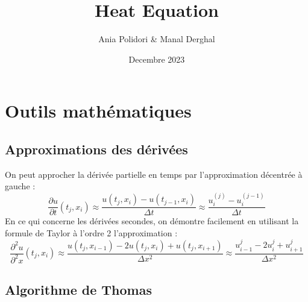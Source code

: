 \documentclass{article}
\title{Heat Equation}
\author{Ania Polidori \& Manal Derghal}
\date{Decembre 2023}
\begin{document}
\maketitle

\tableofcontents

\newpage

\section{Outils mathématiques}

\subsection{Approximations des dérivées}

On peut approcher la dérivée partielle en temps par l'approximation décentrée à gauche :\\
\begin{equation}
\frac{\partial u}{\partial t}(t_j, x_i) \approx \frac{u(t_{j}, x_i) - u(t_{j-1}, x_i)}{\Delta t} \approx \frac{u_{i}^{(j)} - u_{i}^{(j-1)}}{\Delta t}
\end{equation}
En ce qui concerne les dérivées secondes, on démontre facilement en utilisant la formule de Taylor à l’ordre 2 l’approximation :\\
\begin{equation}
\frac{\partial^2 u}{\partial^2 x}(t_j, x_i) \approx \frac{u(t_j, x_{i-1}) - 2u(t_j, x_i)+u(t_j,x_{i+1})}{\Delta x^2} \approx \frac{u_{i-1}^j - 2u_{i}^j+u_{i+1}^j}{\Delta x^2}
\end{equation}

\subsection{Algorithme de Thomas}
\end{document}
